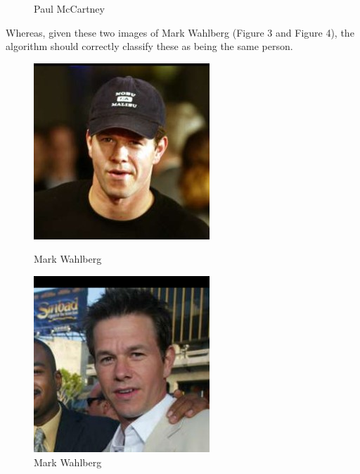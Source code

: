 \documentclass[12pt, a4paper]{article}
\begin{document}
\begin{figure}[H]
  \caption{Paul McCartney}
\endminipage\hfill
\end{figure}
Whereas, given these two images of Mark Wahlberg (Figure 3 and Figure 4), the algorithm should correctly classify these as being the same person.

\begin{figure}[H]
  \includegraphics[width=\linewidth]{images/Mark_Wahlberg_0001.jpg}
  \caption{Mark Wahlberg}
\endminipage\hfill
{}
  \includegraphics[width=\linewidth]{images/Mark_Wahlberg_0004.jpg}
  \caption{Mark Wahlberg}
\endminipage\hfill
\end{figure}
\end{document}
